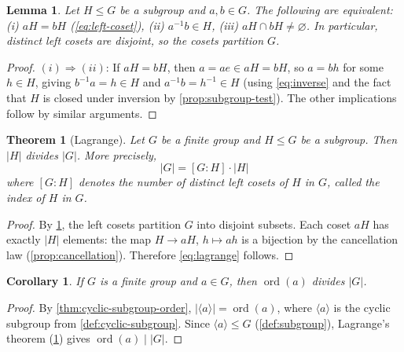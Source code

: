 \documentclass[12pt,a4paper]{article}
\theoremstyle{definition}
\theoremstyle{plain}
\newtheorem{theorem}[definition]{Theorem}
\newtheorem{corollary}[definition]{Corollary}
\newtheorem{lemma}[definition]{Lemma}
\theoremstyle{remark}
\newcommand{\ord}{\operatorname{ord}}
\begin{document}
\begin{lemma}\label{lem:coset-equality}
Let $H \leq G$ be a subgroup and $a, b \in G$.
The following are equivalent:
(i) $aH = bH$ (\cref{eq:left-coset}), \;
(ii) $a^{-1}b \in H$, \;
(iii) $aH \cap bH \neq \varnothing$.
In particular, distinct left cosets are disjoint, so the cosets partition $G$.
\end{lemma}

\begin{proof}
$(i) \Rightarrow (ii)$: If $aH = bH$, then $a = ae \in aH = bH$, so $a = bh$ for some
$h \in H$, giving $b^{-1}a = h \in H$ and $a^{-1}b = h^{-1} \in H$ (using
\cref{eq:inverse} and the fact that $H$ is closed under inversion by
\cref{prop:subgroup-test}).
The other implications follow by similar arguments.
\end{proof}

\begin{theorem}[Lagrange]\label{thm:lagrange}
Let $G$ be a finite group and $H \leq G$ be a subgroup.
Then $|H|$ divides $|G|$. More precisely,
\begin{equation}\label{eq:lagrange}
    |G| = [G : H] \cdot |H|
\end{equation}
where $[G : H]$ denotes the number of distinct left cosets of
$H$ in $G$, called the \emph{index} of $H$ in $G$.
\end{theorem}

\begin{proof}
By \cref{lem:coset-equality}, the left cosets partition $G$ into disjoint subsets.
Each coset $aH$ has exactly $|H|$ elements: the map $H \to aH$, $h \mapsto ah$ is a
bijection by the cancellation law (\cref{prop:cancellation}).
Therefore \cref{eq:lagrange} follows.
\end{proof}

\begin{corollary}\label{cor:order-divides}
If $G$ is a finite group and $a \in G$, then $\ord(a)$ divides $|G|$.
\end{corollary}

\begin{proof}
By \cref{thm:cyclic-subgroup-order}, $|\langle a \rangle| = \ord(a)$, where
$\langle a \rangle$ is the cyclic subgroup from \cref{def:cyclic-subgroup}.
Since $\langle a \rangle \leq G$ (\cref{def:subgroup}), Lagrange's theorem
(\cref{thm:lagrange}) gives $\ord(a) \mid |G|$.
\end{proof}
\end{document}
